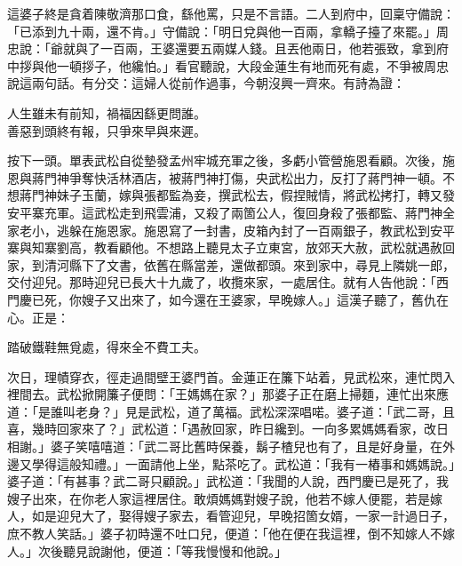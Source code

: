 這婆子終是貪着陳敬濟那口食，繇他罵，只是不言語。{}二人到府中，回稟守備說：「已添到九十兩，還不肯。」守備說：「明日兌與他一百兩，拿轎子擡了來罷。」周忠說：「爺就與了一百兩，王婆還要五兩媒人錢。且丟他兩日，他若張致，拿到府中拶與他一頓拶子，他纔怕。」看官聽說，大段金蓮生有地而死有處，不爭被周忠說這兩句話。有分交：這婦人從前作過事，今朝沒興一齊來。有詩為證：

\begin{myquote}
人生雖未有前知，禍福因繇更問誰。\\善惡到頭終有報，只爭來早與來遲。
\end{myquote}

按下一頭。單表武松自從墊發孟州牢城充軍之後，多虧小管營施恩看顧。次後，施恩與蔣門神爭奪快活林酒店，被蔣門神打傷，央武松出力，反打了蔣門神一頓。不想蔣門神妹子玉蘭，嫁與張都監為妾，撰武松去，假捏賊情，將武松拷打，轉又發安平寨充軍。這武松走到飛雲浦，又殺了兩箇公人，復回身殺了張都監、蔣門神全家老小，逃躲在施恩家。施恩寫了一封書，皮箱內封了一百兩銀子，教武松到安平寨與知寨劉高，教看顧他。不想路上聽見太子立東宮，放郊天大赦，武松就遇赦回家，到清河縣下了文書，依舊在縣當差，還做都頭。來到家中，尋見上隣姚一郎，交付迎兒。那時迎兒已長大十九歲了，收攬來家，一處居住。就有人告他說：「西門慶已死，你嫂子又出來了，如今還在王婆家，早晚嫁人。」這漢子聽了，舊仇在心。正是：

\begin{myquote}
踏破鐵鞋無覓處，得來全不費工夫。
\end{myquote}

次日，理幘穿衣，徑走過間壁王婆門首。金蓮正在簾下站着，見武松來，連忙閃入裡間去。武松掀開簾子便問：「王媽媽在家？」那婆子正在磨上掃麵，連忙出來應道：「是誰叫老身？」見是武松，道了萬福。武松深深唱喏。婆子道：「武二哥，且喜，幾時回家來了？」武松道：「遇赦回家，昨日纔到。一向多累媽媽看家，改日相謝。」婆子笑嘻嘻道：「武二哥比舊時保養，鬍子楂兒也有了，且是好身量，在外邊又學得這般知禮。」{}一面請他上坐，點茶吃了。武松道：「我有一樁事和媽媽說。」婆子道：「有甚事？武二哥只顧說。」武松道：「我聞的人說，西門慶已是死了，我嫂子出來，在你老人家這裡居住。敢煩媽媽對嫂子說，他若不嫁人便罷，若是嫁人，如是迎兒大了，娶得嫂子家去，看管迎兒，早晚招箇女婿，一家一計過日子，庶不教人笑話。」婆子初時還不吐口兒，便道：「他在便在我這裡，倒不知嫁人不嫁人。」次後聽見說謝他，便道：「等我慢慢和他說。」{}

